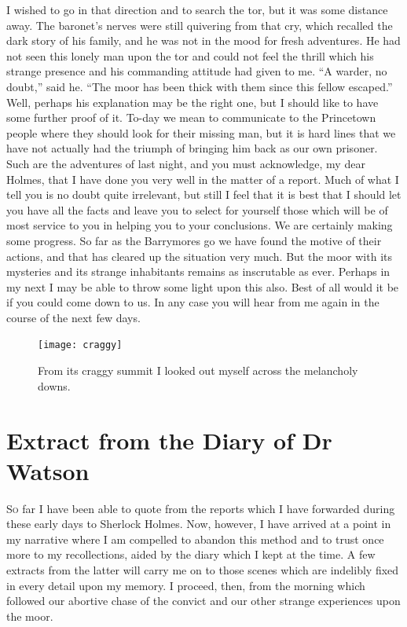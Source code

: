 \documentclass[paper=5.5in:8.5in,BCOR=7mm,twoside,DIV=calc,12pt,usegeometry,openany,chapterprefix,endperiod,headings=big]{scrbook} %
\begin{document}
I wished to go in that direction and to search the tor, but it was some distance away. The baronet's nerves were still quivering from that cry, which recalled the dark story of his family, and he was not in the mood for fresh adventures. He had not seen this lonely man upon the tor and could not feel the thrill which his strange presence and his commanding attitude had given to me. \enquote{A warder, no doubt,} said he. \enquote{The moor has been thick with them since this fellow escaped.} Well, perhaps his explanation may be the right one, but I should like to have some further proof of it. To-day we mean to communicate to the Princetown people where they should look for their missing man, but it is hard lines that we have not actually had the triumph of bringing him back as our own prisoner. Such are the adventures of last night, and you must acknowledge, my dear Holmes, that I have done you very well in the matter of a report. Much of what I tell you is no doubt quite irrelevant, but still I feel that it is best that I should let you have all the facts and leave you to select for yourself those which will be of most service to you in helping you to your conclusions. We are certainly making some progress. So far as the Barrymores go we have found the motive of their actions, and that has cleared up the situation very much. But the moor with its mysteries and its strange inhabitants remains as inscrutable as ever. Perhaps in my next I may be able to throw some light upon this also. Best of all would it be if you could come down to us. In any case you will hear from me again in the course of the next few days.
\clearpage
\vfill
\begin{figure}[tbph]
\centering
\texttt{[image: craggy]}
\caption{From its craggy summit I looked out myself across the melancholy downs.}
\end{figure}
\vfill
\thispagestyle{empty}
\clearpage

\chapter{Extract from the Diary of Dr Watson}
\lettrine[lines=1]{S}{o} far I have been able to quote from the reports which I have forwarded during these early days to Sherlock Holmes. Now, however, I have arrived at a point in my narrative where I am compelled to abandon this method and to trust once more to my recollections, aided by the diary which I kept at the time. A few extracts from the latter will carry me on to those scenes which are indelibly fixed in every detail upon my memory. I proceed, then, from the morning which followed our abortive chase of the convict and our other strange experiences upon the moor.
\vfill
\end{document}
